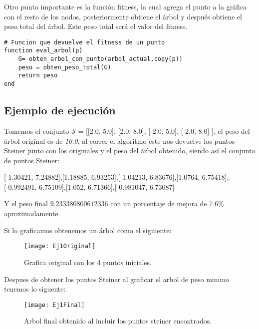 \documentclass[11pt,letterpaper]{article}
\begin{document}
Otro punto importante es la función fitness, la cual agrega el punto a la gráfica con el resto de los nodos, posteriormente obtiene el árbol y después obtiene el peso total del árbol. Este peso total será el valor del fitness.


\begin{lstlisting}
# Funcion que devuelve el fitness de un punto
function eval_arbol(p)
	G= obten_arbol_con_punto(arbol_actual,copy(p))
	peso = obten_peso_total(G)
	return peso
end
\end{lstlisting}


\subsection{Ejemplo de ejecución}

Tomemos el conjunto $\mathcal{S}$ = [[2.0, 5.0], [2.0, 8.0], [-2.0, 5.0], [-2.0, 8.0] ], el peso del árbol original es de \emph{10.0}, al correr el algoritmo este nos devuelve los puntos Steiner junto con los originales y el peso del árbol obtenido, siendo así el conjunto de puntos Steiner:

\begin{center}
	[-1.30421, 7.24882],[1.18885, 6.93253],[-1.04213, 6.83676],[1.0764, 6.75418],[-0.992491, 6.75109],[1.052, 6.71366],[-0.981047, 6.73087]
\end{center}



Y el peso final $9.233380800612336$ con un porcentaje de mejora de 7.6\% aproximadamente.

Si lo graficamos obtenemos un árbol como el siguiente:

\begin{figure}[h!]
	\centering
	\texttt{[image: Ej1Original]}
	\caption{Grafica original con los 4 puntos iniciales.}
	\label{fig:ej1original}
\end{figure}

Despues de obtener los puntos Steiner al graficar el arbol de peso minimo tenemos lo siguente:

\begin{figure}[h!]
	\centering
	\texttt{[image: Ej1Final]}
	\caption{Arbol final obtenido al incluir los puntos steiner encontrados.}
	\label{fig:ej1final}
\end{figure}
\end{document}
